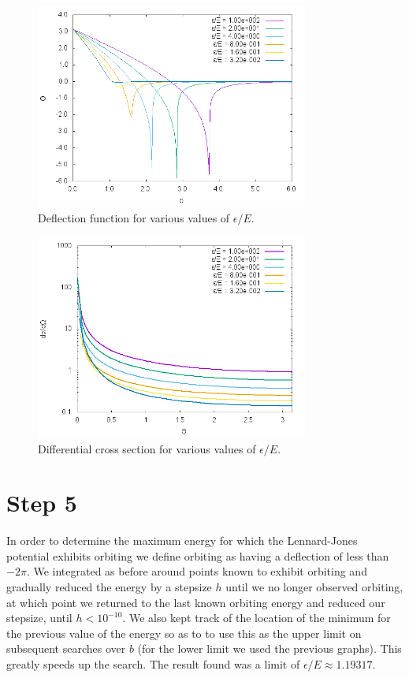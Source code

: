 \begin{figure}
  \centering
  \includegraphics[width=0.8\textwidth]{./plots/01_04}
  \caption{Deflection function for various values of $\epsilon/E$.}
  \label{fig:01_04}
\end{figure}

\begin{figure}
  \centering
  \includegraphics[width=0.8\textwidth]{./plots/01_04b}
  \caption{Differential cross section for various values of $\epsilon/E$.}
  \label{fig:01_04b}
\end{figure}


\section{Step 5}
In order to determine the maximum energy for which the Lennard-Jones potential exhibits
orbiting we define orbiting as having a deflection of less than $-2\pi$. We integrated as before around
points known to exhibit orbiting and gradually reduced the energy by a stepsize $h$ until we no longer observed orbiting,
at which point we returned to the last known orbiting energy and reduced our stepsize, until $h < 10^{-10}$. We also kept track of the location of the minimum for the previous value of the energy so
as to to use this as the upper limit on subsequent searches over $b$ (for the lower limit we used the previous graphs). This greatly speeds up the search. The result found was a limit of $\epsilon/E \approx 1.19317$.

